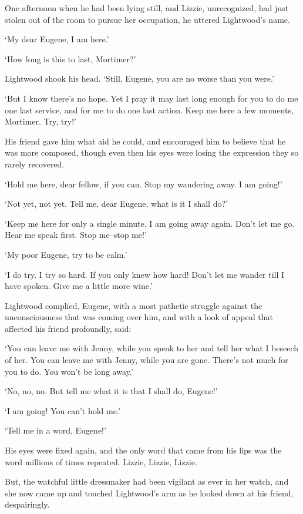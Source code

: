 One afternoon when he had been lying still, and Lizzie, unrecognized,
had just stolen out of the room to pursue her occupation, he uttered
Lightwood’s name.

‘My dear Eugene, I am here.’

‘How long is this to last, Mortimer?’

Lightwood shook his head. ‘Still, Eugene, you are no worse than you
were.’

‘But I know there’s no hope. Yet I pray it may last long enough for you
to do me one last service, and for me to do one last action. Keep me
here a few moments, Mortimer. Try, try!’

His friend gave him what aid he could, and encouraged him to believe
that he was more composed, though even then his eyes were losing the
expression they so rarely recovered.

‘Hold me here, dear fellow, if you can. Stop my wandering away. I am
going!’

‘Not yet, not yet. Tell me, dear Eugene, what is it I shall do?’

‘Keep me here for only a single minute. I am going away again. Don’t let
me go. Hear me speak first. Stop me--stop me!’

‘My poor Eugene, try to be calm.’

‘I do try. I try so hard. If you only knew how hard! Don’t let me wander
till I have spoken. Give me a little more wine.’

Lightwood complied. Eugene, with a most pathetic struggle against the
unconsciousness that was coming over him, and with a look of appeal that
affected his friend profoundly, said:

‘You can leave me with Jenny, while you speak to her and tell her what I
beseech of her. You can leave me with Jenny, while you are gone. There’s
not much for you to do. You won’t be long away.’

‘No, no, no. But tell me what it is that I shall do, Eugene!’

‘I am going! You can’t hold me.’

‘Tell me in a word, Eugene!’

His eyes were fixed again, and the only word that came from his lips was
the word millions of times repeated. Lizzie, Lizzie, Lizzie.

But, the watchful little dressmaker had been vigilant as ever in her
watch, and she now came up and touched Lightwood’s arm as he looked down
at his friend, despairingly.

